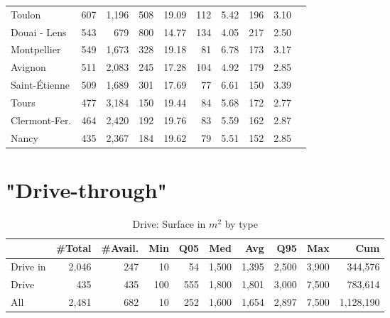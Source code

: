 \documentclass[11pt]{article}
\begin{document}
\begin{table}[H]
\begin{tabular}{llrrrrrrrr}
          Toulon &        607 &      1,196 &          508 &      19.09 &        112 &       5.42 &        196 &        3.10 \\
    Douai - Lens &        543 &        679 &          800 &      14.77 &        134 &       4.05 &        217 &        2.50 \\
     Montpellier &        549 &      1,673 &          328 &      19.18 &         81 &       6.78 &        173 &        3.17 \\
         Avignon &        511 &      2,083 &          245 &      17.28 &        104 &       4.92 &        179 &        2.85 \\
   Saint-Étienne &        509 &      1,689 &          301 &      17.69 &         77 &       6.61 &        150 &        3.39 \\
           Tours &        477 &      3,184 &          150 &      19.44 &         84 &       5.68 &        172 &        2.77 \\
   Clermont-Fer. &        464 &      2,420 &          192 &      19.76 &         83 &       5.59 &        162 &        2.87 \\
           Nancy &        435 &      2,367 &          184 &      19.62 &         79 &       5.51 &        152 &        2.85 \\
\bottomrule
\end{tabular}

\end{table}

\clearpage

\appendix

\section{"Drive-through"}

\begin{table}[H]
\caption{Drive: Surface in $m^2$ by type}
\small

\begin{tabular}{lrrrrrrrrr}
\toprule
\toprule
{} &     \#Total &    \#Avail. &        Min &        Q05 &        Med &        Avg &        Q95 &        Max &        Cum \\
\midrule
Drive in &      2,046 &        247 &         10 &         54 &      1,500 &      1,395 &      2,500 &      3,900 &    344,576 \\
Drive    &        435 &        435 &        100 &        555 &      1,800 &      1,801 &      3,000 &      7,500 &    783,614 \\
All      &      2,481 &        682 &         10 &        252 &      1,600 &      1,654 &      2,897 &      7,500 &  1,128,190 \\
\bottomrule
\end{tabular}

\end{table}
\end{document}
